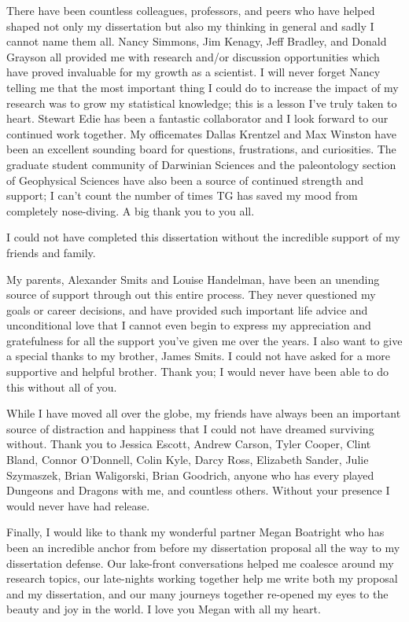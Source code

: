 \documentclass{ucetd}  %
\begin{document}
There have been countless colleagues, professors, and peers who have helped shaped not only my dissertation but also my thinking in general and sadly I cannot name them all. Nancy Simmons, Jim Kenagy, Jeff Bradley, and Donald Grayson all provided me with research and/or discussion opportunities which have proved invaluable for my growth as a scientist. I will never forget Nancy telling me that the most important thing I could do to increase the impact of my research was to grow my statistical knowledge; this is a lesson I've truly taken to heart. Stewart Edie has been a fantastic collaborator and I look forward to our continued work together. My officemates Dallas Krentzel and Max Winston have been an excellent sounding board for questions, frustrations, and curiosities. The graduate student community of Darwinian Sciences and the paleontology section of Geophysical Sciences have also been a source of continued strength and support; I can't count the number of times TG has saved my mood from completely nose-diving. A big thank you to you all.

I could not have completed this dissertation without the incredible support of my friends and family. 

My parents, Alexander Smits and Louise Handelman, have been an unending source of support through out this entire process. They never questioned my goals or career decisions, and have provided such important life advice and unconditional love that I cannot even begin to express my appreciation and gratefulness for all the support you've given me over the years. I also want to give a special thanks to my brother, James Smits. I could not have asked for a more supportive and helpful brother. Thank you; I would never have been able to do this without all of you.

While I have moved all over the globe, my friends have always been an important source of distraction and happiness that I could not have dreamed surviving without. Thank you to Jessica Escott, Andrew Carson, Tyler Cooper, Clint Bland, Connor O'Donnell, Colin Kyle, Darcy Ross, Elizabeth Sander, Julie Szymaszek, Brian Waligorski, Brian Goodrich, anyone who has every played Dungeons and Dragons with me, and countless others. Without your presence I would never have had release.

Finally, I would like to thank my wonderful partner Megan Boatright who has been an incredible anchor from before my dissertation proposal all the way to my dissertation defense. Our lake-front conversations helped me coalesce around my research topics, our late-nights working together help me write both my proposal and my dissertation, and our many journeys together re-opened my eyes to the beauty and joy in the world. I love you Megan with all my heart.
\end{document}

